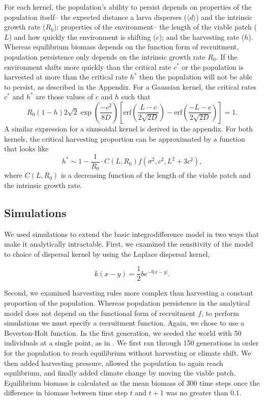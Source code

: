 \documentclass[12pt,english]{article}
\begin{document}
For each kernel, the population's ability to persist depends on properties of the population itself-- the expected distance a larva disperses ($\langle d \rangle$) and the intrinsic growth rate ($R_0$); properties of the environment-- the length of the viable patch ($L$) and how quickly the environment is shifting ($c$); and the harvesting rate ($h
$).  Whereas equilibrium biomass depends on the function form of recruitment, population persistence only depends on the intrinsic growth rate $R_0$.  If the environment shifts more quickly than the critical rate $c^*$ or the population is harvested at more than 
the critical rate $h^*$ then the population will not be able to persist, as described in the Appendix.  For a Gaussian kernel, the critical rates $c^*$ and $h^*$ are those values of $c$ and $h$ such that 
$$R_0(1-h)2\sqrt{2}\exp\left(\frac{-c^2}{8D}\right)\left[\text{erf}\left(\frac{L-c}{2\sqrt{2D}}\right)-\text{erf}\left(\frac{-L-c}{2\sqrt{2D}}\right)\right]=1.$$
A similar expression for a sinusoidal kernel is derived in the appendix.  For both kernels, the critical harvesting proportion can be approximated by a function that looks like 
\begin{equation}
h^*\sim1- \frac{1}{R_0}\cdot C(L,R_0)f(\sigma^2,c^2,L^2+3c^2),
\end{equation}
where $C(L,R_0)$ is a decreasing function of the length of the viable patch and the intrinsic growth rate.


\subsection{Simulations }

We used simulations to extend the basic integrodifference model in two ways that make it analytically 
intractable. First, we examined the sensitivity of the model to choice of dispersal kernel by using the Laplace 
dispersal kernel, 

\[ k(x-y)=\frac{1}{2}be^{-b|x-y|}.\]

\noindent Second, we examined harvesting rules more complex than harvesting a constant proportion of the population. Whereas population persistence in the analytical model does not depend on the functional form of recruitment $f$, to perform simulations we must 
specify a recruitment function.  Again, we chose to use a Beverton-Holt function.  In the first generation, we seeded the world with 50 individuals at a single point, as in \citep{ZhouKot2011}. We first ran through 150 generations in order for the population to reach equilibrium without harvesting or climate shift.  We then added harvesting pressure, allowed the population to again reach equilibrium, and finally added climate change by moving the viable patch.  Equilibrium biomass is calculated as the mean biomass of 300 time steps once the difference in biomass between time step $t$ and $t+1$ was no greater than $0.1$.  
\end{document}
